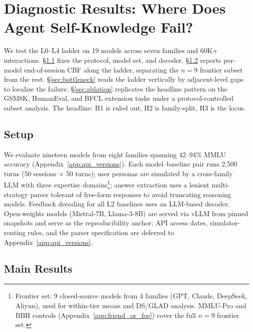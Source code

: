\documentclass[11pt]{article}
\begin{document}
\section{Diagnostic Results: Where Does Agent Self-Knowledge Fail?}
\label{sec:experiments}

We test the L0--L4 ladder on 19 models across seven families and 60K+ interactions. \S\ref{sec:setup} fixes the protocol, model set, and decoder. \S\ref{sec:results} reports per-model end-of-session CBF along the ladder, separating the $n{=}9$ frontier subset from the rest. \S\ref{sec:bottleneck} reads the ladder vertically by adjacent-level gaps to localize the failure. \S\ref{sec:ablation} replicates the headline pattern on the GSM8K, HumanEval, and BFCL extension tasks under a protocol-controlled subset analysis. The headline: H1 is ruled out, H2 is family-split, H3 is the locus.

\subsection{Setup}
\label{sec:setup}

We evaluate nineteen models from eight families spanning 42--94\% MMLU accuracy (Appendix~\ref{app:api_versions}). Each model--baseline pair runs 2,500 turns (50 sessions $\times$ 50 turns); user personas are simulated by a cross-family LLM with three expertise domains\footnote{Frontier set: 9 closed-source models from 4 families (GPT, Claude, DeepSeek, Aliyun), used for within-tier means and DS/GLAD analysis. MMLU-Pro and BBH controls (Appendix~\ref{app:friend_or_foe}) cover the full $n{=}9$ frontier set.}; answer extraction uses a lenient multi-strategy parser tolerant of free-form responses to avoid truncating reasoning models. Feedback decoding for all L2 baselines uses an LLM-based decoder. Open-weights models (Mistral-7B, Llama-3-8B) are served via vLLM from pinned snapshots and serve as the reproducibility anchor; API access dates, simulator-routing rules, and the parser specification are deferred to Appendix~\ref{app:api_versions}.

\subsection{Main Results}
\label{sec:results}
\end{document}
